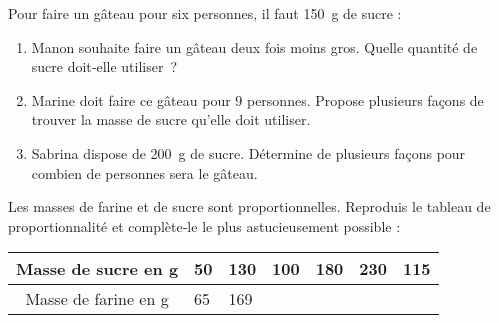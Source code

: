 
\begin{activite}

\begin{partie}
Pour faire un gâteau pour six personnes, il faut 150 g de sucre :
\begin{enumerate}
 \item Manon souhaite faire un gâteau deux fois moins gros. Quelle quantité de sucre doit‑elle utiliser ?
 \item Marine doit faire ce gâteau pour 9 personnes. Propose plusieurs façons de trouver la masse de sucre qu'elle doit utiliser.
 \item Sabrina dispose de 200 g de sucre. Détermine de plusieurs façons pour combien de personnes sera le gâteau.
 \end{enumerate}
\end{partie}

\begin{partie}
Les masses de farine et de sucre sont proportionnelles. Reproduis le tableau de proportionnalité et complète‑le le plus astucieusement possible : \\[0.5em]
\begin{center}
 \begin{tabularx}{0.7\linewidth}{|c|X|X|X|X|X|X|}
 \hline
\rowcolor{H3} Masse de sucre en g & 50 & 130 & 100 & 180 & 230 & 115 \\\hline
\rowcolor{F3} Masse de farine en g & 65 & 169 & & & & \\\hline
 \end{tabularx}
 \end{center}
\end{partie}

\end{activite}



